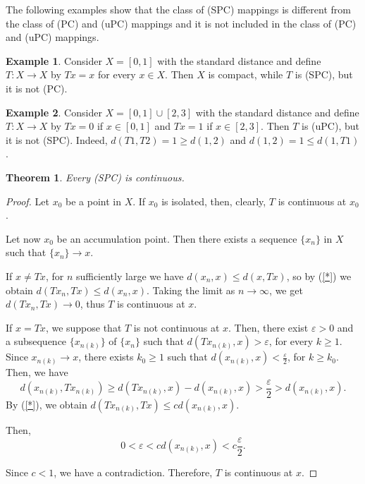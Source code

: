 \documentclass[12 pt]{article}
\theoremstyle{lema}
\theoremstyle{proposition}
\theoremstyle{theorem}
\newtheorem{theorem}{Theorem}[section]
\theoremstyle{theorem}
\theoremstyle{corollary}
\theoremstyle{definition}
\theoremstyle{example}
\newtheorem{example}{Example}[section]
\begin{document}
	The following examples show that the class of (SPC) mappings is different from the class of (PC) and (uPC) mappings and it is not included in the class of (PC) and (uPC) mappings.
	
	\begin{example}
		Consider $X = [0,1]$ with the standard distance and define \(T : X \to X \) by \(Tx=x\) for every \(x \in X\). Then \(X\) is compact, while \(T\) is (SPC), but it is not (PC).
	\end{example}

	\begin{example}
		Consider $X = [0,1] \cup [2,3]$ with the standard distance and define \(T : X \to X \) by \(Tx=0\) if \(x \in [0,1]\) and \(Tx=1\) if \(x \in [2,3]\). Then \(T\) is (uPC), but it is not (SPC). Indeed, \(d(T1,T2) = 1 \geq d(1,2)\) and \(d(1,2) = 1 \leq d(1,T1)\).
	\end{example}

	\begin{theorem}
		Every (SPC) is continuous.
	\end{theorem}

	\begin{proof}
		Let \(x_0\) be a point in \(X\).  If \(x_0\) is isolated, then, clearly, \(T\) is continuous at \(x_0\). 
		
		Let now \(x_0\) be an accumulation point. Then there exists a sequence \(\{x_n\}\) in \(X\) such that \(\{x_n\} \to x\). 
		
		If \(x \neq Tx\), for \(n\) sufficiently large we have \(d(x_n,x) \leq d(x,Tx)\), so by (\ref{*}) we obtain \(d(Tx_n,Tx) \leq d(x_n,x)\). Taking the limit as \( n \to \infty \), we get \( d(Tx_n,Tx) \to 0\), thus \( T\) is continuous at \(x\).
		
		If \( x= Tx \), we suppose that \(T\) is not continuous at \(x\). Then, there exist \(\varepsilon > 0\) and a subsequence \(\{x_{n(k)}\}\) of \(\{x_n\}\) such that \(d(Tx_{n(k)}, x) > \varepsilon\), for every \(k \geq 1\). Since \(x_{n(k)} \to x\), there exists \(k_0 \geq 1\) such that \(d(x_{n(k)},x) < \frac{\varepsilon}{2}\), for \(k \geq k_0\). Then, we have 
		\[d(x_{n(k)}, Tx_{n(k)}) \geq d(Tx_{n(k)},x) - d(x_{n(k)},x)> \frac{\varepsilon}2 > d(x_{n(k)},x).\] By (\ref{*}), we obtain \(d(Tx_{n(k)},Tx) \leq c d(x_{n(k)},x)\).
		
		Then, 
		\[0< \varepsilon < c d(x_{n(k)},x) < c \frac{\varepsilon}{2}.\]
		
		Since \(c <1\), we have a contradiction. Therefore, \(T\) is continuous at \(x\).
	\end{proof}
\end{document}
